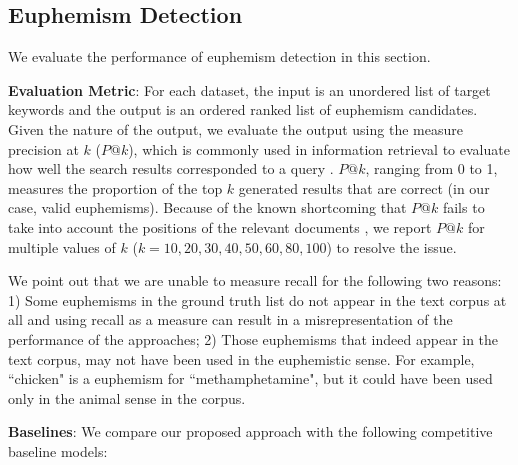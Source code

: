 \subsection{Euphemism Detection}
\label{sec:res_det}
We evaluate the performance of euphemism detection in this section. 

\noindent \textbf{Evaluation Metric}: 
For each dataset, the input is an unordered list of target keywords and the output is an ordered ranked list of euphemism candidates. 
Given the nature of the output, we evaluate the output using the measure precision at $k$ ($P@k$), which is commonly used in information retrieval to evaluate how well the search results corresponded to a query \cite{manning2008introduction}. 
$P@k$, ranging from 0 to 1, measures the proportion of the top $k$ generated results that are correct (in our case, valid euphemisms). 
Because of the known shortcoming that $P@k$ fails to take into account the positions of the relevant documents \cite{jarvelin2017ir}, we report $P@k$ for multiple values of $k$ ($k=10, 20, 30, 40, 50, 60, 80, 100$) to resolve the issue. 

We point out that we are unable to measure recall for the following two reasons: 
1) Some euphemisms in the ground truth list do not appear in the text corpus at all and using recall as a measure can result in a misrepresentation of the performance of the approaches; 
2) Those euphemisms that indeed appear in the text corpus,  may not have been used in the euphemistic sense. 
For example, ``chicken" is a euphemism for ``methamphetamine", but it could have been used only in the animal sense in the corpus. 





\noindent \textbf{Baselines}: 
We compare our proposed approach with the following competitive baseline models:

